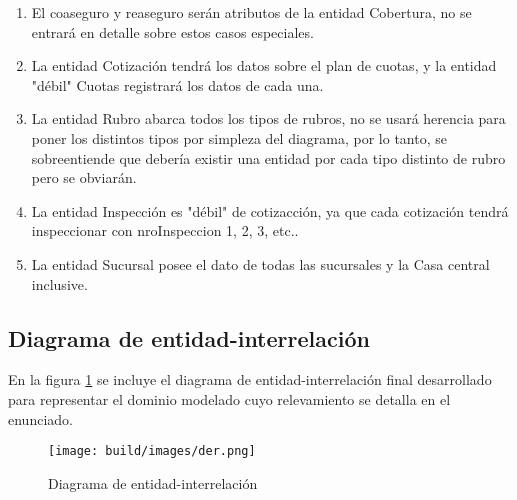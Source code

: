 \documentclass[a4paper,11pt]{article}
\begin{document}
\begin{enumerate}

  \item El coaseguro y reaseguro serán atributos de la entidad Cobertura, no se entrará en detalle sobre estos casos especiales.
 
  \item La entidad Cotización tendrá los datos sobre el plan de cuotas, y la entidad "débil" Cuotas registrará los datos de cada una.
 
  \item La entidad Rubro abarca todos los tipos de rubros, no se usará herencia para poner los distintos tipos por simpleza del diagrama, por lo tanto, se sobreentiende que debería existir una entidad por cada tipo distinto de rubro pero se obviarán.
 
  \item La entidad Inspección es "débil" de cotizacción, ya que cada cotización tendrá inspeccionar con nroInspeccion 1, 2, 3, etc..
 
  \item La entidad Sucursal posee el dato de todas las sucursales y la Casa central inclusive.
  
\end{enumerate}


\subsection{Diagrama de entidad-interrelación}

 En la figura \ref{fig:der} se incluye el diagrama de entidad-interrelación
 final desarrollado para representar el dominio modelado cuyo relevamiento se
 detalla en el enunciado.

\begin{figure}[h!t]
  \centering
  \texttt{[image: build/images/der.png]}
  \caption{Diagrama de entidad-interrelación} \label{fig:der}
\end{figure}

\FloatBarrier



\end{document}
